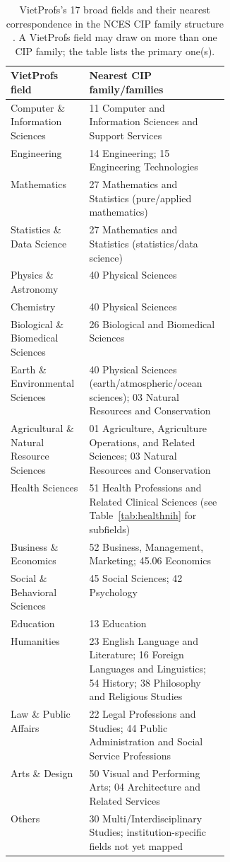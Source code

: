 \documentclass[11pt]{article}
\begin{document}
\begin{table}[t]
\centering
\caption{VietProfs's 17 broad fields and their nearest correspondence in the NCES CIP family
structure \cite{nces_cip2020}. A VietProfs field may draw on more than one CIP family; the table
lists the primary one(s).}
\label{tab:fieldmap}
\small
\begin{tabularx}{\linewidth}{@{}p{0.36\linewidth}X@{}}
\toprule
VietProfs field & Nearest CIP family/families \\
\midrule
Computer \& Information Sciences & 11 Computer and Information Sciences and Support Services \\
Engineering & 14 Engineering; 15 Engineering Technologies \\
Mathematics & 27 Mathematics and Statistics (pure/applied mathematics) \\
Statistics \& Data Science & 27 Mathematics and Statistics (statistics/data science) \\
Physics \& Astronomy & 40 Physical Sciences \\
Chemistry & 40 Physical Sciences \\
Biological \& Biomedical Sciences & 26 Biological and Biomedical Sciences \\
Earth \& Environmental Sciences & 40 Physical Sciences (earth/atmospheric/ocean sciences); 03
Natural Resources and Conservation \\
Agricultural \& Natural Resource Sciences & 01 Agriculture, Agriculture Operations, and Related
Sciences; 03 Natural Resources and Conservation \\
Health Sciences & 51 Health Professions and Related Clinical Sciences (see Table~\ref{tab:healthnih}
for subfields) \\
Business \& Economics & 52 Business, Management, Marketing; 45.06 Economics \\
Social \& Behavioral Sciences & 45 Social Sciences; 42 Psychology \\
Education & 13 Education \\
Humanities & 23 English Language and Literature; 16 Foreign Languages and Linguistics; 54 History;
38 Philosophy and Religious Studies \\
Law \& Public Affairs & 22 Legal Professions and Studies; 44 Public Administration and Social
Service Professions \\
Arts \& Design & 50 Visual and Performing Arts; 04 Architecture and Related Services \\
Others & 30 Multi/Interdisciplinary Studies; institution-specific fields not yet mapped \\
\bottomrule
\end{tabularx}
\end{table}
\end{document}

